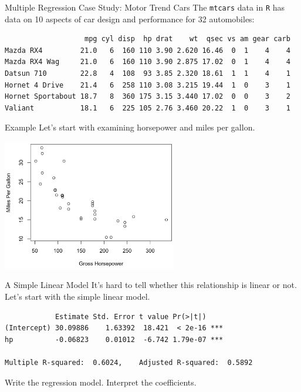 \begin{frame}[fragile]{Multiple Regression Case Study: Motor Trend Cars}
    The \texttt{mtcars} data in \texttt{R} has data on 10 aspects of car design and performance for 32 automobiles:
    \footnotesize{
    \begin{verbatim}
                   mpg cyl disp  hp drat    wt  qsec vs am gear carb
Mazda RX4         21.0   6  160 110 3.90 2.620 16.46  0  1    4    4
Mazda RX4 Wag     21.0   6  160 110 3.90 2.875 17.02  0  1    4    4
Datsun 710        22.8   4  108  93 3.85 2.320 18.61  1  1    4    1
Hornet 4 Drive    21.4   6  258 110 3.08 3.215 19.44  1  0    3    1
Hornet Sportabout 18.7   8  360 175 3.15 3.440 17.02  0  0    3    2
Valiant           18.1   6  225 105 2.76 3.460 20.22  1  0    3    1
    \end{verbatim}}
\end{frame}

\begin{frame}{Example}
    Let's start with examining horsepower and miles per gallon.
    \begin{center}
        \includegraphics[width=3in]{images/mtcars1.png}
    \end{center}
\end{frame}

\begin{frame}[fragile]{A Simple Linear Model}
    It's hard to tell whether this relationship is linear or not. Let's start with the simple linear model.
    \begin{verbatim}
            Estimate Std. Error t value Pr(>|t|)    
(Intercept) 30.09886    1.63392  18.421  < 2e-16 ***
hp          -0.06823    0.01012  -6.742 1.79e-07 ***

Multiple R-squared:  0.6024,	Adjusted R-squared:  0.5892 
    \end{verbatim}
    Write the regression model. Interpret the coefficients. 
\end{frame}

